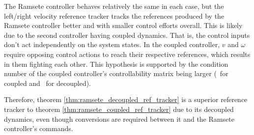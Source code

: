 The Ramsete \gls{controller} behaves relatively the same in each case, but the
left/right velocity \gls{reference} tracker tracks the \glspl{reference}
produced by the Ramsete \gls{controller} better and with smaller
\glspl{control effort} overall. This is likely due to the second
\gls{controller} having coupled dynamics. That is, the control inputs don't act
independently on the system \glspl{state}. In the coupled \gls{controller}, $v$
and $\omega$ require opposing control actions to reach their respective
\glspl{reference}, which results in them fighting each other. This hypothesis is
supported by the condition number of the coupled \gls{controller}'s
controllability matrix being larger
(\unskip~for coupled and
\unskip~for decoupled).

Therefore, theorem \ref{thm:ramsete_decoupled_ref_tracker} is a superior
\gls{reference} tracker to theorem \ref{thm:ramsete_coupled_ref_tracker} due to
its decoupled dynamics, even though conversions are required between it and the
Ramsete \gls{controller}'s commands.
